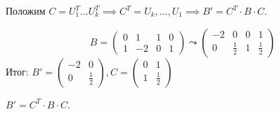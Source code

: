 \documentclass[a4paper]{article}
\begin{document}
\begin{colloq}
            Положим $C = U^{T}_{1} \dots U^{T}_{k} \implies C^{T} = U_{k}, \dots , U_{1} \implies B' = C^{T} \cdot B \cdot C $.

            \begin{example}
                \begin{equation*}
                    B = \left(
                        \begin{array}{cc|cc} 
                            0 & 1 & 1 & 0 \\ 
                            1 & -2 & 0 & 1
                        \end{array} 
                    \right) \leadsto
                    \left(
                        \begin{array}{cc|cc}
                            -2 & 0 & 0 & 1 \\
                            0 & \frac{1}{2} & 1 & \frac{1}{2}
                        \end{array}
                    \right)
                \end{equation*}
                Итог: $B' = \begin{pmatrix} -2 & 0 \\ 0 & \frac{1}{2} \end{pmatrix}, C = \begin{pmatrix} 0 & 1 \\ 1 & \frac{1}{2} \end{pmatrix}$

                $B' = C^{T} \cdot B \cdot C$.
            \end{example}

\end{colloq}
\end{document}
